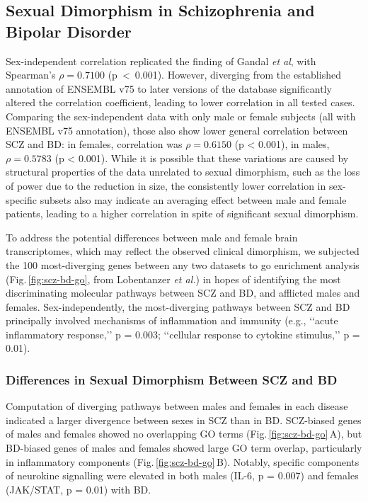 \subsection{Sexual Dimorphism in Schizophrenia and Bipolar Disorder}
Sex-independent correlation replicated the finding of Gandal \emph{et al},\cite{Gandal2018} with Spearman's $\rho = 0.7100$ \mbox{(p < 0.001)}. However, diverging from the established annotation of ENSEMBL v75 to later versions of the database significantly altered the correlation coefficient, leading to lower correlation in all tested cases. Comparing the sex-independent data with only male or female subjects (all with ENSEMBL v75 annotation), those also show lower general correlation between SCZ and BD: in females, correlation was $\rho = 0.6150$ (p < 0.001), in males, $\rho = 0.5783$ (p < 0.001). While it is possible that these variations are caused by structural properties of the data unrelated to sexual dimorphism, such as the loss of power due to the reduction in size, the consistently lower correlation in sex-specific subsets also may indicate an averaging effect between male and female patients, leading to a higher correlation in spite of significant sexual dimorphism.

 To address the potential differences between male and female brain transcriptomes, which may reflect the observed clinical dimorphism, we subjected the 100 most-diverging genes between any two datasets to \ac{go} enrichment analysis (Fig.\,\ref{fig:scz-bd-go}, from Lobentanzer \emph{et al.}\cite{Lobentanzer2019a}) in hopes of identifying the most discriminating molecular pathways between SCZ and BD, and afflicted males and females. Sex-independently, the most-diverging pathways between SCZ and BD principally involved mechanisms of inflammation and immunity (e.g., ‘‘acute inflammatory response,’’ p = 0.003; ‘‘cellular response to cytokine stimulus,’’ p = 0.01).

\subsubsection{Differences in Sexual Dimorphism Between SCZ and BD}
Computation of diverging pathways between males and females in each disease indicated a larger divergence between sexes in SCZ than in BD. SCZ-biased genes of males and females showed no overlapping GO terms (Fig.\,\ref{fig:scz-bd-go}\,A), but BD-biased genes of males and females showed large GO term overlap, particularly in inflammatory components (Fig.\,\ref{fig:scz-bd-go}\,B). Notably, specific components of neurokine signalling were elevated in both males (IL-6, p = 0.007) and females (JAK/STAT, p = 0.01) with BD.

